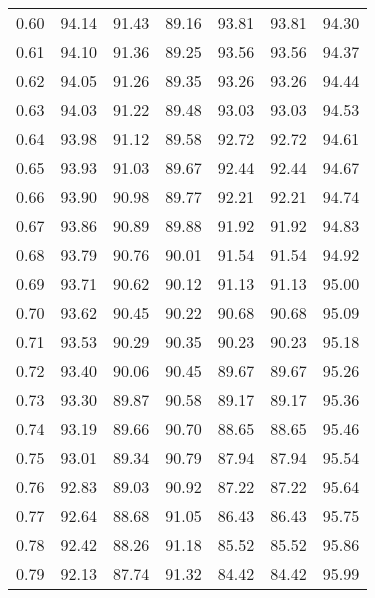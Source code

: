 \begin{tabular}{|c|c|c|c|c|c|c|}
      0.60 &     94.14 &     91.43 &      89.16 &   93.81 &      93.81 &         94.30 \\
      0.61 &     94.10 &     91.36 &      89.25 &   93.56 &      93.56 &         94.37 \\
      0.62 &     94.05 &     91.26 &      89.35 &   93.26 &      93.26 &         94.44 \\
      0.63 &     94.03 &     91.22 &      89.48 &   93.03 &      93.03 &         94.53 \\
      0.64 &     93.98 &     91.12 &      89.58 &   92.72 &      92.72 &         94.61 \\
      0.65 &     93.93 &     91.03 &      89.67 &   92.44 &      92.44 &         94.67 \\
      0.66 &     93.90 &     90.98 &      89.77 &   92.21 &      92.21 &         94.74 \\
      0.67 &     93.86 &     90.89 &      89.88 &   91.92 &      91.92 &         94.83 \\
      0.68 &     93.79 &     90.76 &      90.01 &   91.54 &      91.54 &         94.92 \\
      0.69 &     93.71 &     90.62 &      90.12 &   91.13 &      91.13 &         95.00 \\
      0.70 &     93.62 &     90.45 &      90.22 &   90.68 &      90.68 &         95.09 \\
      0.71 &     93.53 &     90.29 &      90.35 &   90.23 &      90.23 &         95.18 \\
      0.72 &     93.40 &     90.06 &      90.45 &   89.67 &      89.67 &         95.26 \\
      0.73 &     93.30 &     89.87 &      90.58 &   89.17 &      89.17 &         95.36 \\
      0.74 &     93.19 &     89.66 &      90.70 &   88.65 &      88.65 &         95.46 \\
      0.75 &     93.01 &     89.34 &      90.79 &   87.94 &      87.94 &         95.54 \\
      0.76 &     92.83 &     89.03 &      90.92 &   87.22 &      87.22 &         95.64 \\
      0.77 &     92.64 &     88.68 &      91.05 &   86.43 &      86.43 &         95.75 \\
      0.78 &     92.42 &     88.26 &      91.18 &   85.52 &      85.52 &         95.86 \\
      0.79 &     92.13 &     87.74 &      91.32 &   84.42 &      84.42 &         95.99 \\

\end{tabular}
